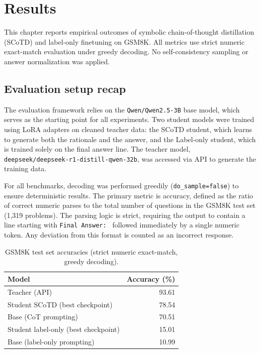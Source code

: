 \chapter{Results}

This chapter reports empirical outcomes of symbolic chain-of-thought distillation (SCoTD) and label-only finetuning on GSM8K. All metrics use strict numeric exact-match evaluation under greedy decoding. No self-consistency sampling or answer normalization was applied.

\section{Evaluation setup recap}
The evaluation framework relies on the \texttt{Qwen/Qwen2.5-3B} base model, which serves as the starting point for all experiments. Two student models were trained using LoRA adapters on cleaned teacher data: the SCoTD student, which learns to generate both the rationale and the answer, and the Label-only student, which is trained solely on the final answer line. The teacher model, \texttt{deepseek/deepseek-r1-distill-qwen-32b}, was accessed via API to generate the training data.

For all benchmarks, decoding was performed greedily (\texttt{do\_sample=false}) to ensure deterministic results. The primary metric is accuracy, defined as the ratio of correct numeric parses to the total number of questions in the GSM8K test set (1{,}319 problems). The parsing logic is strict, requiring the output to contain a line starting with \texttt{Final Answer: } followed immediately by a single numeric token. Any deviation from this format is counted as an incorrect response.

\begin{table}[!h]
    \centering
    \begin{tabular}{l r}
        \hline
        Model & Accuracy (\%) \\
        \hline
        Teacher (API) & 93.61 \\
        Student SCoTD (best checkpoint) & 78.54 \\
        Base (CoT prompting) & 70.51 \\
        Student label-only (best checkpoint) & 15.01 \\
        Base (label-only prompting) & 10.99 \\
        \hline
    \end{tabular}
    \caption{GSM8K test set accuracies (strict numeric exact-match, greedy decoding).}
    \label{tab:headline-accuracies}
\end{table}

